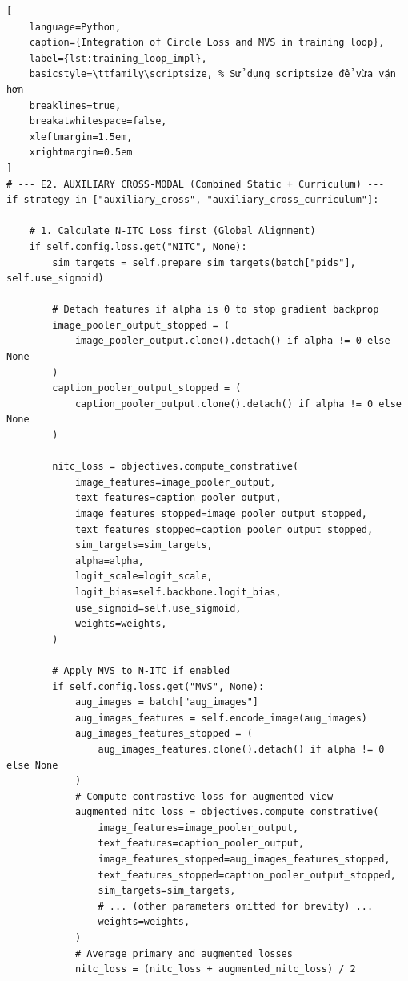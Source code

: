 \documentclass[../main.tex]{subfiles}
\begin{document}
\begin{lstlisting}[
    language=Python, 
    caption={Integration of Circle Loss and MVS in training loop},
    label={lst:training_loop_impl},
    basicstyle=\ttfamily\scriptsize, % Sử dụng scriptsize để vừa vặn hơn
    breaklines=true,
    breakatwhitespace=false,
    xleftmargin=1.5em, 
    xrightmargin=0.5em
]
# --- E2. AUXILIARY CROSS-MODAL (Combined Static + Curriculum) ---
if strategy in ["auxiliary_cross", "auxiliary_cross_curriculum"]:

    # 1. Calculate N-ITC Loss first (Global Alignment)
    if self.config.loss.get("NITC", None):
        sim_targets = self.prepare_sim_targets(batch["pids"], self.use_sigmoid)

        # Detach features if alpha is 0 to stop gradient backprop
        image_pooler_output_stopped = (
            image_pooler_output.clone().detach() if alpha != 0 else None
        )
        caption_pooler_output_stopped = (
            caption_pooler_output.clone().detach() if alpha != 0 else None
        )

        nitc_loss = objectives.compute_constrative(
            image_features=image_pooler_output,
            text_features=caption_pooler_output,
            image_features_stopped=image_pooler_output_stopped,
            text_features_stopped=caption_pooler_output_stopped,
            sim_targets=sim_targets,
            alpha=alpha,
            logit_scale=logit_scale,
            logit_bias=self.backbone.logit_bias,
            use_sigmoid=self.use_sigmoid,
            weights=weights,
        )

        # Apply MVS to N-ITC if enabled
        if self.config.loss.get("MVS", None):
            aug_images = batch["aug_images"]
            aug_images_features = self.encode_image(aug_images)
            aug_images_features_stopped = (
                aug_images_features.clone().detach() if alpha != 0 else None
            )
            # Compute contrastive loss for augmented view
            augmented_nitc_loss = objectives.compute_constrative(
                image_features=image_pooler_output, 
                text_features=caption_pooler_output,
                image_features_stopped=aug_images_features_stopped,
                text_features_stopped=caption_pooler_output_stopped,
                sim_targets=sim_targets,
                # ... (other parameters omitted for brevity) ...
                weights=weights,
            )
            # Average primary and augmented losses
            nitc_loss = (nitc_loss + augmented_nitc_loss) / 2
        

\end{lstlisting}
\end{document}
